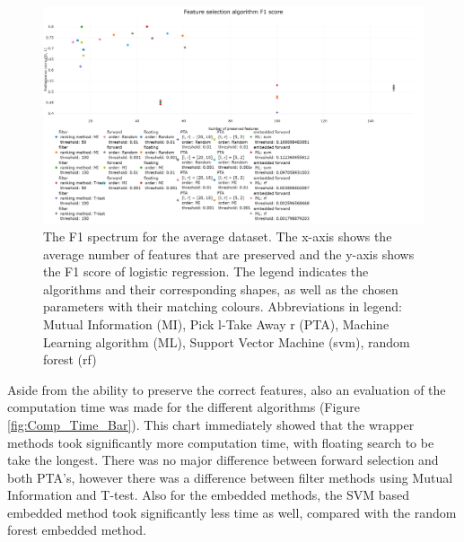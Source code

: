 \begin{figure}[H]
	\centering
	\includegraphics[angle=90,height=1.4\textwidth]{F1_new.png}
	\caption{The F1 spectrum for the average dataset. The x-axis shows the average number of features that are preserved and the y-axis shows the F1 score of logistic regression. The legend indicates the algorithms and their corresponding shapes, as well as the chosen parameters with their matching colours. Abbreviations in legend: Mutual Information (MI), Pick l-Take Away r (PTA), Machine Learning algorithm (ML), Support Vector Machine (svm), random forest (rf)}
	\label{fig:Avg_F1_Spectrum}
\end{figure}

	Aside from the ability to preserve the correct features, also an evaluation of the computation time was made for the different algorithms (Figure \ref{fig:Comp_Time_Bar}). This chart immediately showed that the wrapper methods took significantly more computation time, with floating search to be take the longest. There was no major difference between forward selection and both PTA's, however there was a difference between filter methods using Mutual Information and T-test. Also for the embedded methods, the SVM based embedded method took significantly less time as well, compared with the random forest embedded method.

